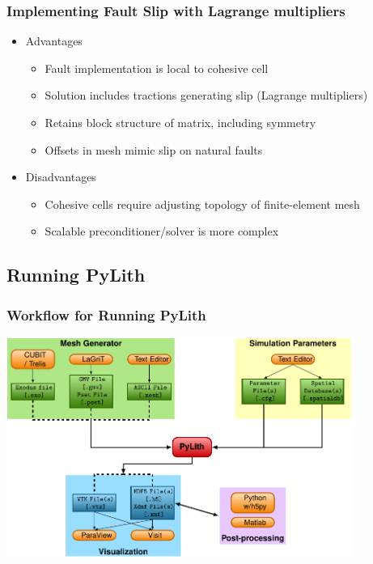 \documentclass{beamer}
\begin{document}
\begin{frame}
  \frametitle{Implementing Fault Slip with Lagrange multipliers}
 
 \begin{itemize}
 \item Advantages
   \begin{itemize}
   \item Fault implementation is local to cohesive cell
   \item Solution includes tractions generating slip (Lagrange multipliers)
   \item Retains block structure of matrix, including symmetry
   \item Offsets in mesh mimic slip on natural faults
   \end{itemize}
 \item Disadvantages 
   \begin{itemize}
   \item Cohesive cells require adjusting topology of finite-element
     mesh
   \item Scalable preconditioner/solver is more complex
  \end{itemize}
 \end{itemize}
  
\end{frame}


\subsection{Running PyLith}

\begin{frame}
  \frametitle{Workflow for Running PyLith}

  \begin{center}
    \includegraphics[height=7.2cm]{figs/runpylith}
  \end{center}
   
\end{frame}
\end{document}

